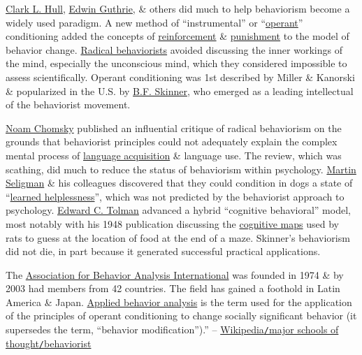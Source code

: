 \documentclass[oneside]{book}
\numberwithin{equation}{section}
\begin{document}
\href{https://en.wikipedia.org/wiki/Clark_L._Hull}{Clark L. Hull}, \href{https://en.wikipedia.org/wiki/Edwin_Guthrie}{Edwin Guthrie}, \& others did much to help behaviorism become a widely used paradigm. A new method of ``instrumental'' or ``\href{https://en.wikipedia.org/wiki/Operant_conditioning}{operant}'' conditioning added the concepts of \href{https://en.wikipedia.org/wiki/Reinforcement}{reinforcement} \& \href{https://en.wikipedia.org/wiki/Punishment}{punishment} to the model of behavior change. \href{https://en.wikipedia.org/wiki/Radical_behaviorism}{Radical behaviorists} avoided discussing the inner workings of the mind, especially the unconscious mind, which they considered impossible to assess scientifically. Operant conditioning was 1st described by Miller \& Kanorski \& popularized in the U.S. by \href{https://en.wikipedia.org/wiki/B.F._Skinner}{B.F. Skinner}, who emerged as a leading intellectual of the behaviorist movement.

\href{https://en.wikipedia.org/wiki/Noam_Chomsky}{Noam Chomsky} published an influential critique of radical behaviorism on the grounds that behaviorist principles could not adequately explain the complex mental process of \href{https://en.wikipedia.org/wiki/Language_acquisition}{language acquisition} \& language use. The review, which was scathing, did much to reduce the status of behaviorism within psychology. \href{https://en.wikipedia.org/wiki/Martin_Seligman}{Martin Seligman} \& his colleagues discovered that they could condition in dogs a state of ``\href{https://en.wikipedia.org/wiki/Learned_helplessness}{learned helplessness}'', which was not predicted by the behaviorist approach to psychology. \href{https://en.wikipedia.org/wiki/Edward_C._Tolman}{Edward C. Tolman} advanced a hybrid ``cognitive behavioral'' model, most notably with his 1948 publication discussing the \href{https://en.wikipedia.org/wiki/Cognitive_map}{cognitive maps} used by rats to guess at the location of food at the end of a maze. Skinner's behaviorism did not die, in part because it generated successful practical applications.

The \href{https://en.wikipedia.org/wiki/Association_for_Behavior_Analysis_International}{Association for Behavior Analysis International} was founded in 1974 \& by 2003 had members from 42 countries. The field has gained a foothold in Latin America \& Japan. \href{https://en.wikipedia.org/wiki/Applied_behavior_analysis}{Applied behavior analysis} is the term used for the application of the principles of operant conditioning to change socially significant behavior (it supersedes the term, ``behavior modification'').'' -- \href{https://en.wikipedia.org/wiki/Psychology#Behaviorist}{Wikipedia\texttt{/}major schools of thought\texttt{/}behaviorist}
\end{document}
